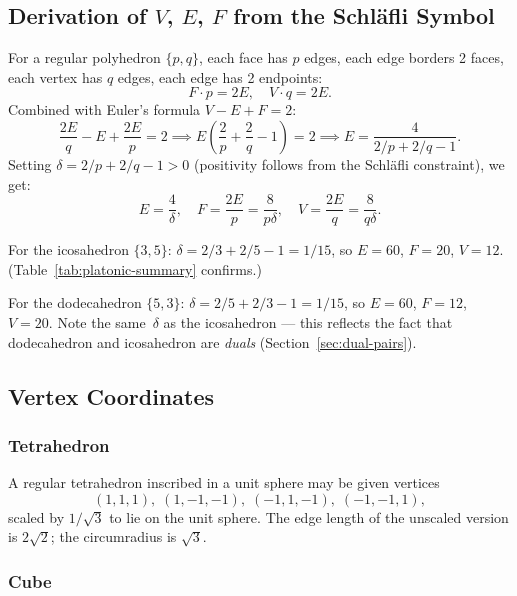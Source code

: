 \subsection{Derivation of $V$, $E$, $F$ from the Schläfli Symbol}
\label{subsec:vef-from-schlafli}

For a regular polyhedron $\{p,q\}$, each face has $p$ edges, each edge borders
2 faces, each vertex has $q$ edges, each edge has 2 endpoints:
\[
  F \cdot p = 2E, \quad V \cdot q = 2E.
\]
Combined with Euler's formula $V - E + F = 2$:
\[
  \frac{2E}{q} - E + \frac{2E}{p} = 2
  \implies E\left(\frac{2}{p} + \frac{2}{q} - 1\right) = 2
  \implies E = \frac{4}{2/p + 2/q - 1}.
\]
Setting $\delta = 2/p + 2/q - 1 > 0$ (positivity follows from the Schläfli
constraint), we get:
\[
  E = \frac{4}{\delta}, \quad
  F = \frac{2E}{p} = \frac{8}{p\delta}, \quad
  V = \frac{2E}{q} = \frac{8}{q\delta}.
\]

\begin{example}
For the icosahedron $\{3,5\}$: $\delta = 2/3 + 2/5 - 1 = 1/15$, so
$E = 60$, $F = 20$, $V = 12$.  (Table~\ref{tab:platonic-summary} confirms.)
\end{example}

\begin{example}
For the dodecahedron $\{5,3\}$: $\delta = 2/5 + 2/3 - 1 = 1/15$, so
$E = 60$, $F = 12$, $V = 20$.  Note the same~$\delta$ as the icosahedron —
this reflects the fact that dodecahedron and icosahedron are \emph{duals}
(Section~\ref{sec:dual-pairs}).
\end{example}

\subsection{Vertex Coordinates}
\label{sec:coordinates}

\subsubsection{Tetrahedron}
\label{subsubsec:tetra-coords}

A regular tetrahedron inscribed in a unit sphere may be given vertices
\[
  (1,1,1),\;(1,-1,-1),\;(-1,1,-1),\;(-1,-1,1),
\]
scaled by $1/\sqrt{3}$ to lie on the unit sphere.  The edge length of the
unscaled version is $2\sqrt{2}$; the circumradius is $\sqrt{3}$.

\subsubsection{Cube}
\label{subsubsec:cube-coords}

